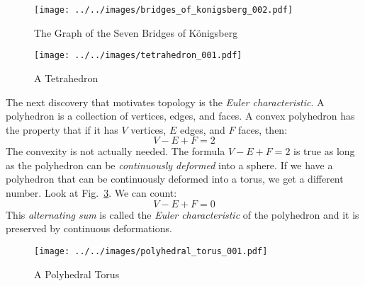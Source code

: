 \documentclass{article}
\theoremstyle{plain}
\theoremstyle{normal}
\begin{document}
        \begin{figure}
            \centering
            \texttt{[image: ../../images/bridges\_of\_konigsberg\_002.pdf]}
            \caption{The Graph of the Seven Bridges of K\"{o}nigsberg}
            \label{fig:bridges_of_konigsberg_002}
        \end{figure}
        \begin{figure}
            \centering
            \texttt{[image: ../../images/tetrahedron\_001.pdf]}
            \caption{A Tetrahedron}
            \label{fig:tetrahedron_001}
        \end{figure}
        \par\hfill\par
        The next discovery that motivates topology is the
        \textit{Euler characteristic}. A polyhedron is a collection of vertices,
        edges, and faces. A convex polyhedron has the property that if it has
        $V$ vertices, $E$ edges, and $F$ faces, then:
        \begin{equation}
            V-E+F=2
        \end{equation}
        The convexity is not actually needed. The formula $V-E+F=2$ is true as
        long as the polyhedron can be \textit{continuously deformed} into a
        sphere. If we have a polyhedron that can be continuously deformed into
        a torus, we get a different number. Look at
        Fig.~\ref{fig:polyhedral_torus_001}. We can count:
        \begin{equation}
            V-E+F=0
        \end{equation}
        This \textit{alternating sum} is called the
        \textit{Euler characteristic}
        of the polyhedron and it is preserved by continuous deformations.
        \begin{figure}
            \centering
            \texttt{[image: ../../images/polyhedral\_torus\_001.pdf]}
            \caption{A Polyhedral Torus}
            \label{fig:polyhedral_torus_001}
        \end{figure}
\end{document}
